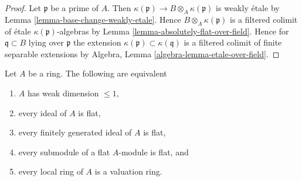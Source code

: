 \begin{proof}
Let $\mathfrak p$ be a prime of $A$. Then
$\kappa(\mathfrak p) \to B \otimes_A \kappa(\mathfrak p)$ is weakly \'etale by
Lemma \ref{lemma-base-change-weakly-etale}.
Hence $B \otimes_A \kappa(\mathfrak p)$ is a filtered colimit of
\'etale $\kappa(\mathfrak p)$-algebras by
Lemma \ref{lemma-absolutely-flat-over-field}.
Hence for $\mathfrak q \subset B$ lying over $\mathfrak p$ the
extension $\kappa(\mathfrak p) \subset \kappa(\mathfrak q)$ is
a filtered colimit of finite separable extensions by
Algebra, Lemma \ref{algebra-lemma-etale-over-field}.
\end{proof}

\begin{lemma}
\label{lemma-weak-dimension-at-most-1}
Let $A$ be a ring. The following are equivalent
\begin{enumerate}
\item $A$ has weak dimension $\leq 1$,
\item every ideal of $A$ is flat,
\item every finitely generated ideal of $A$ is flat,
\item every submodule of a flat $A$-module is flat, and
\item every local ring of $A$ is a valuation ring.
\end{enumerate}
\end{lemma}

